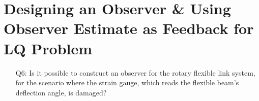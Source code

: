 \section{Designing an Observer \& Using Observer Estimate as Feedback for LQ Problem}\label{section:lab4_observer_lqr}
\begin{enumerate}
    \item[Q6:] Is it possible to construct an observer for the rotary flexible link system, for the scenario where the strain gauge, which reads the flexible beam's deflection angle, is damaged?\\
\end{enumerate}

